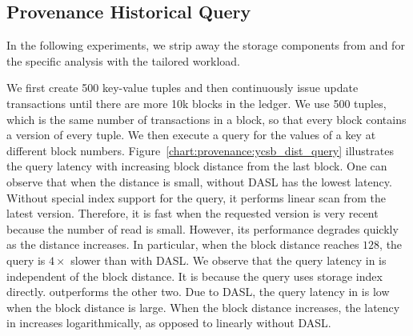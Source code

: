 \subsection{Provenance Historical Query}
In the following experiments, we strip away the storage components from {\fsO} and {\fsPrO} for the specific analysis with the tailored workload. 

We first create 500 key-value tuples and then continuously issue update transactions until there are more 10k blocks in the ledger. We use 500 tuples, which is the same number of transactions in a block, so that every block contains a version of every tuple.  
We then execute a query for
the values of a key at different block numbers. Figure~\ref{chart:provenance:ycsb_dist_query} illustrates the query latency with  
increasing block distance from the last block. One can observe that when the distance is small, {\fsO} without DASL has the lowest latency. Without special index support for the query, it performs linear scan from the latest
version. Therefore, it is fast when the requested version is very recent because the number of read is small.
However, its performance degrades quickly as the distance increases. In particular, when the block distance
reaches $128$, the query is $4\times$ slower than {\fsO} with DASL. We observe that the query latency in
{\fsPrO} is independent of the block distance. It is because the query uses storage index directly. {\fsO}
outperforms the other two. Due to DASL, the query latency in {\fsO} is low when the block distance is
large. When the block distance increases, the latency in {\fsO} increases logarithmically, as opposed to
linearly without DASL.  

